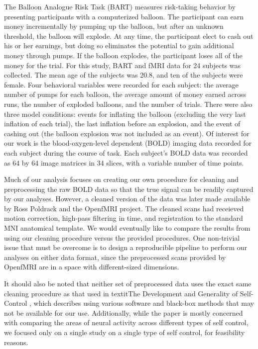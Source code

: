\par \indent The Balloon Analogue Risk Task (BART) measures risk-taking 
behavior by presenting participants with a computerized balloon. The 
participant can earn money incrementally by pumping up the balloon, but after 
an unknown threshold, the balloon will explode. At any time, the participant 
elect to cash out his or her earnings, but doing so eliminates the potential to 
gain additional money through pumps. If the balloon explodes, the participant 
loses all of the money for the trial. For this study, BART and fMRI data for 24 
subjects was collected. The mean age of the subjects was 20.8, and ten of the 
subjects were female. Four behavioral variables were recorded for each subject: 
the average number of pumps for each balloon, the average amount of money 
earned across runs, the number of exploded balloons, and the number of trials. 
There were also three model conditions: events for inflating the balloon 
(excluding the very last inflation of each trial), the last inflation before an 
explosion, and the event of cashing out (the balloon explosion was not included 
as an event). Of interest for our work is the blood-oxygen-level dependent 
(BOLD) imaging data recorded for each subject during the course of task. Each 
subject's BOLD data was recorded as 64 by 64 image matrices in 34 slices, with 
a variable number of time points. 

\par Much of our analysis focuses on creating our own procedure for cleaning 
and preprocessing the raw BOLD data so that the true signal can be readily 
captured by our analyses. However, a cleaned version of the data was later made 
available by Ross Poldrack and the OpenfMRI project. The cleaned scans had 
receieved motion correction, high-pass filtering in time, and registration to the 
standard MNI anatomical template. We would eventually like to compare the 
results from using our cleaning procedure versus the provided procedures. One 
non-trivial issue that must be overcome is to design a reproducible pipeline to 
perform our analyses on either data format, since the preprocessed scans provided 
by OpenfMRI are in a space with different-sized dimensions. 

\par It should also be noted that neither set of preprocessed data uses the exact 
same cleaning procedure as that used in textit{The Development and Generality of 
Self-Control} \cite{CohenSelfControl}, which describes using various software and 
black-box methods that may not be available for our use. Additionally, while the 
paper is mostly concerned with comparing the areas of neural activity across 
different types of self control, we focused only on a single study on a single 
type of self control, for feasibility reasons. 

